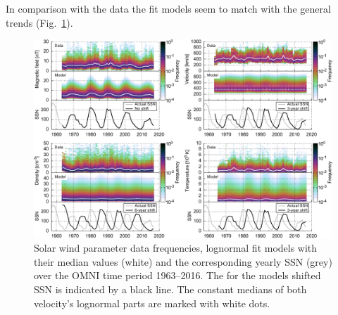 In comparison with the data the fit models seem to match with the general trends (Fig.~\ref{fig:OMNI_yearly_BVdblNTSSN_fit_d_plot}).\\
\begin{figure}
	\includegraphics[width=18cm]{figures/OMNI_yearly_BVdblNTSSN_fit_d_plot.pdf}
	\caption{Solar wind parameter data frequencies, lognormal fit models with their median values (white) and the corresponding yearly SSN (grey) over the OMNI time period 1963--2016. The for the models shifted SSN is indicated by a black line. The constant medians of both velocity's lognormal parts are marked with white dots.}
	\label{fig:OMNI_yearly_BVdblNTSSN_fit_d_plot}
\end{figure}

